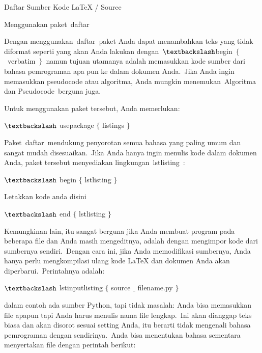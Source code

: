 \sloppy
Daftar Sumber Kode LaTeX / Source\par

Menggunakan paket daftar \par

Dengan menggunakan daftar paket Anda dapat menambahkan teks yang tidak diformat seperti yang akan Anda lakukan dengan $\textbackslash$begin $ \{ $ verbatim $ \} $ namun tujuan utamanya adalah memasukkan kode sumber dari bahasa pemrograman apa pun ke dalam dokumen Anda. Jika Anda ingin memasukkan pseudocode atau algoritma, Anda mungkin menemukan Algoritma dan Pseudocode berguna juga.\par

Untuk menggunakan paket tersebut, Anda memerlukan:\par

$\textbackslash$ usepackage $ \{ $ listings $ \} $\par

Paket daftar mendukung penyorotan semua bahasa yang paling umum dan sangat mudah disesuaikan. Jika Anda hanya ingin menulis kode dalam dokumen Anda, paket tersebut menyediakan lingkungan lstlisting :\par

$\textbackslash$ begin $ \{ $ lstlisting $ \} $\par

 Letakkan kode anda disini\par

 $\textbackslash$ end $ \{ $ lstlisting $ \} $\par

Kemungkinan lain, itu sangat berguna jika Anda membuat program pada beberapa file dan Anda masih mengeditnya, adalah dengan mengimpor kode dari sumbernya sendiri. Dengan cara ini, jika Anda memodifikasi sumbernya, Anda hanya perlu mengkompilasi ulang kode LaTeX dan dokumen Anda akan diperbarui. Perintahnya adalah:\par

$\textbackslash$ lstinputlisting $ \{ $ source $ \_ $ filename.py $ \} $\par

dalam contoh ada sumber Python, tapi tidak masalah: Anda bisa memasukkan file apapun tapi Anda harus menulis nama file lengkap. Ini akan dianggap teks biasa dan akan disorot sesuai setting Anda, itu berarti tidak mengenali bahasa pemrograman dengan sendirinya. Anda bisa menentukan bahasa sementara menyertakan file dengan perintah berikut:\par

